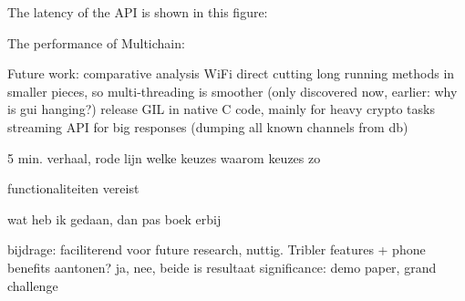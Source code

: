 The latency of the API is shown in this figure:

The performance of Multichain:





Future work:
comparative analysis
WiFi direct
cutting long running methods in smaller pieces, so multi-threading is smoother (only discovered now, earlier: why is gui hanging?)
release GIL in native C code, mainly for heavy crypto tasks
streaming API for big responses (dumping all known channels from db)



5 min. verhaal, rode lijn
welke keuzes
waarom keuzes zo

functionaliteiten vereist


wat heb ik gedaan, dan pas boek erbij


bijdrage: faciliterend voor future research, nuttig. Tribler features + phone benefits
aantonen? ja, nee, beide is resultaat
significance: demo paper, grand challenge

